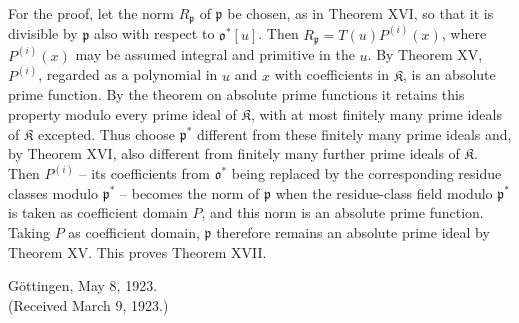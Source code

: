 \documentclass[11pt]{article}
\providecommand{\frakp}{\mathfrak p}
\providecommand{\frakp}{\mathfrak p}
\providecommand{\frakp}{\mathfrak p}
\begin{document}
For the proof, let the norm $R_\frakp$ of $\frakp$ be chosen, as in Theorem XVI, so that it is divisible by $\frakp$ also with respect to $\mathfrak o^*[u]$. Then
$R_\frakp=T(u)P^{(i)}(x)$, where $P^{(i)}(x)$ may be assumed integral and primitive in the $u$. By Theorem XV, $P^{(i)}$, regarded as a polynomial in $u$ and $x$ with coefficients in $\mathfrak K$, is an absolute prime function. By the theorem on absolute prime functions it retains this property modulo every prime ideal of $\mathfrak K$, with at most finitely many prime ideals of $\mathfrak K$ excepted. Thus choose $\frakp^*$ different from these finitely many prime ideals and, by Theorem XVI, also different from finitely many further prime ideals of $\mathfrak K$. Then $P^{(i)}$ -- its coefficients from $\mathfrak o^*$ being replaced by the corresponding residue classes modulo $\frakp^*$ -- becomes the norm of $\frakp$ when the residue-class field modulo $\frakp^*$ is taken as coefficient domain $P$, and this norm is an absolute prime function. Taking $P$ as coefficient domain, $\frakp$ therefore remains an absolute prime ideal by Theorem XV. This proves Theorem XVII.

\begin{center}
Göttingen, May 8, 1923.\\[1em]
(Received March 9, 1923.)
\end{center}



\clearpage
\end{document}

